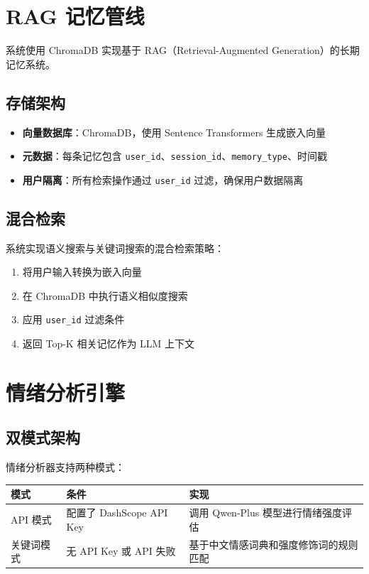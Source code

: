 \documentclass[12pt,a4paper]{ctexart}
\begin{document}
\section{RAG 记忆管线}

系统使用 ChromaDB 实现基于 RAG（Retrieval-Augmented Generation）的长期记忆系统。

\subsection{存储架构}

\begin{itemize}[leftmargin=2em]
    \item \textbf{向量数据库}：ChromaDB，使用 Sentence Transformers 生成嵌入向量
    \item \textbf{元数据}：每条记忆包含 \texttt{user\_id}、\texttt{session\_id}、\texttt{memory\_type}、时间戳
    \item \textbf{用户隔离}：所有检索操作通过 \texttt{user\_id} 过滤，确保用户数据隔离
\end{itemize}

\subsection{混合检索}

系统实现语义搜索与关键词搜索的混合检索策略：

\begin{enumerate}[leftmargin=2em]
    \item 将用户输入转换为嵌入向量
    \item 在 ChromaDB 中执行语义相似度搜索
    \item 应用 \texttt{user\_id} 过滤条件
    \item 返回 Top-K 相关记忆作为 LLM 上下文
\end{enumerate}

\section{情绪分析引擎}

\subsection{双模式架构}

情绪分析器支持两种模式：

\begin{table}[htbp]
\centering
\begin{tabular}{@{}llp{7cm}@{}}
\toprule
\textbf{模式} & \textbf{条件} & \textbf{实现} \\
\midrule
API 模式 & 配置了 DashScope API Key & 调用 Qwen-Plus 模型进行情绪强度评估 \\
关键词模式 & 无 API Key 或 API 失败 & 基于中文情感词典和强度修饰词的规则匹配 \\
\bottomrule
\end{tabular}
\end{table}
\end{document}
